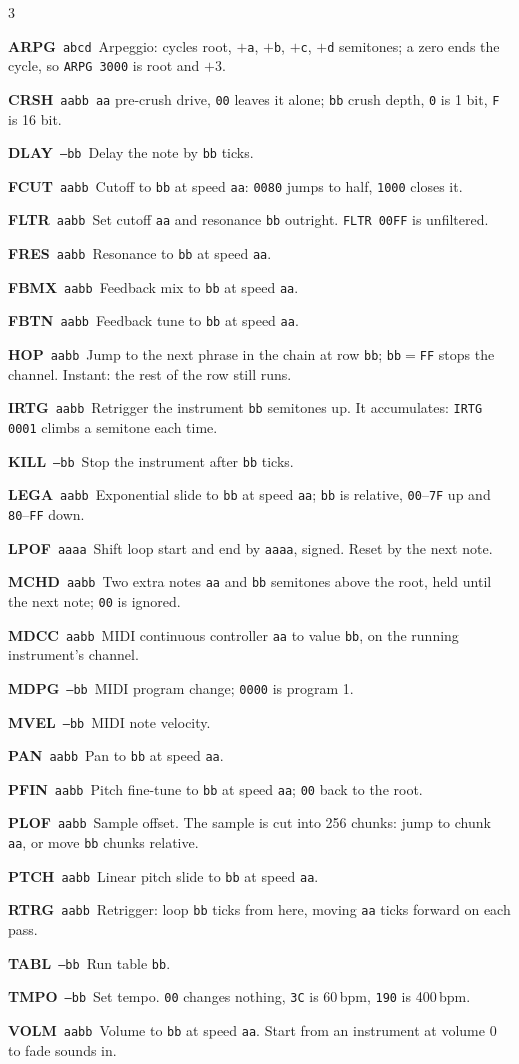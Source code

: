 \documentclass[8pt,a4paper]{extarticle}
\newcommand{\entry}[2]{\par\addvspace{0.28mm}\noindent\hangindent=2.4mm\hangafter=1 #1~#2\par}
\newcommand{\cmd}[3]{\entry{\textbf{\color{accent}#1}~{\scriptsize\texttt{#2}}}{#3}}
\newcommand{\sq}[1]{\texttt{#1}}
\begin{document}
\begin{multicols}{3}
\cmd{ARPG}{abcd}{Arpeggio: cycles root, $+$\sq{a}, $+$\sq{b}, $+$\sq{c},
$+$\sq{d} semitones; a zero ends the cycle, so \sq{ARPG 3000} is root and $+3$.}
\cmd{CRSH}{aabb}{\sq{aa} pre-crush drive, \sq{00} leaves it alone; \sq{bb}
crush depth, \sq{0} is 1 bit, \sq{F} is 16 bit.}
\cmd{DLAY}{--bb}{Delay the note by \sq{bb} ticks.}
\cmd{FCUT}{aabb}{Cutoff to \sq{bb} at speed \sq{aa}: \sq{0080} jumps to half,
\sq{1000} closes it.}
\cmd{FLTR}{aabb}{Set cutoff \sq{aa} and resonance \sq{bb} outright.
\sq{FLTR 00FF} is unfiltered.}
\cmd{FRES}{aabb}{Resonance to \sq{bb} at speed \sq{aa}.}
\cmd{FBMX}{aabb}{Feedback mix to \sq{bb} at speed \sq{aa}.}
\cmd{FBTN}{aabb}{Feedback tune to \sq{bb} at speed \sq{aa}.}
\cmd{HOP}{aabb}{Jump to the next phrase in the chain at row \sq{bb};
\sq{bb}${=}$\sq{FF} stops the channel. Instant: the rest of the row still runs.}
\cmd{IRTG}{aabb}{Retrigger the instrument \sq{bb} semitones up. It accumulates:
\sq{IRTG 0001} climbs a semitone each time.}
\cmd{KILL}{--bb}{Stop the instrument after \sq{bb} ticks.}
\cmd{LEGA}{aabb}{Exponential slide to \sq{bb} at speed \sq{aa}; \sq{bb} is
relative, \sq{00}--\sq{7F} up and \sq{80}--\sq{FF} down.}
\cmd{LPOF}{aaaa}{Shift loop start and end by \sq{aaaa}, signed. Reset by the
next note.}
\cmd{MCHD}{aabb}{Two extra notes \sq{aa} and \sq{bb} semitones above the root,
held until the next note; \sq{00} is ignored.}
\cmd{MDCC}{aabb}{MIDI continuous controller \sq{aa} to value \sq{bb}, on the
running instrument's channel.}
\cmd{MDPG}{--bb}{MIDI program change; \sq{0000} is program 1.}
\cmd{MVEL}{--bb}{MIDI note velocity.}
\cmd{PAN}{aabb}{Pan to \sq{bb} at speed \sq{aa}.}
\cmd{PFIN}{aabb}{Pitch fine-tune to \sq{bb} at speed \sq{aa}; \sq{00} back to
the root.}
\cmd{PLOF}{aabb}{Sample offset. The sample is cut into 256 chunks: jump to
chunk \sq{aa}, or move \sq{bb} chunks relative.}
\cmd{PTCH}{aabb}{Linear pitch slide to \sq{bb} at speed \sq{aa}.}
\cmd{RTRG}{aabb}{Retrigger: loop \sq{bb} ticks from here, moving \sq{aa} ticks
forward on each pass.}
\cmd{TABL}{--bb}{Run table \sq{bb}.}
\cmd{TMPO}{--bb}{Set tempo. \sq{00} changes nothing, \sq{3C} is 60\,bpm,
\sq{190} is 400\,bpm.}
\cmd{VOLM}{aabb}{Volume to \sq{bb} at speed \sq{aa}. Start from an instrument
at volume 0 to fade sounds in.}


\end{multicols}
\end{document}
